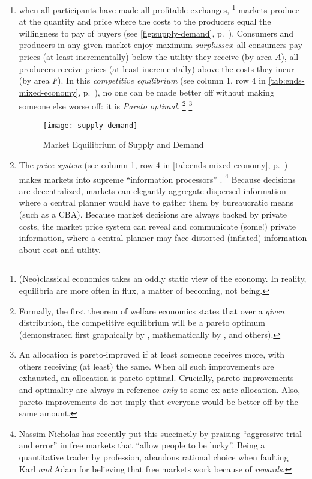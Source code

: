\begin{enumerate}
	\item when all  participants have made all profitable exchanges,
	\footnote{
		(Neo)classical economics takes an oddly static view of the economy.
		In reality, equilibria are more often in flux, a matter of becoming, not being.
	}
	markets produce at the quantity and price where the costs to the producers equal the willingness to pay of buyers (see \autoref{fig:supply-demand}, p.~\pageref{fig:supply-demand}).
	Consumers and producers in any given market enjoy maximum \emph{surplusses}:
	all consumers pay prices (at least incrementally) below the utility they receive (by area $A$), all producers receive prices (at least incrementally) above the costs they incur (by area $F$).
	In this \emph{competitive equilibrium} (see column 1, row 4 in \autoref{tab:ends-mixed-economy}, p.~\pageref{tab:ends-mixed-economy}), no one can be made better off without making someone else worse off:
	it is \emph{Pareto optimal}.
	\footnote{\label{fn:1st-theorem}
		Formally, the first theorem of welfare economics states that over a \emph{given} distribution, the competitive equilibrium will be a pareto optimum (demonstrated first graphically by \cite{Lerner1944}, mathematically by \cite{Lange1934}, \cite{Debreu1954} and others).
	}
	\footnote{
		An allocation is pareto-improved if at least someone receives more, with others receiving (at least) the same.
		When all such improvements are exhausted, an allocation is pareto optimal.
		Crucially, pareto improvements and optimality are always in reference \emph{only} to some ex-ante allocation.
		Also, pareto improvements do not imply that everyone would be better off by the same amount.
	}
	\begin{figure}[htbp]
		\centering
		\texttt{[image: supply-demand]}
		\caption{Market Equilibrium of Supply and Demand}
		\label{fig:supply-demand}
	\end{figure}

	\item The \emph{price system} (see column 1, row 4 in \autoref{tab:ends-mixed-economy}, p.~\pageref{tab:ends-mixed-economy}) makes markets into supreme ``information processors'' \citep{Hayek1931}.
	\footnote{
		Nassim Nicholas \citeauthor{Taleb2007} has recently put this succinctly by praising ``aggressive trial and error'' \citeyearpar[xxi]{Taleb2007} in free markets that ``allow people to be lucky''.
		Being a quantitative trader by profession, \citeauthor{Taleb2007} abandons rational choice when faulting Karl \citeauthor{Marx-1867-aa} \emph{and} Adam \citeauthor{Smith-1776-lq} for believing that free markets work because of \emph{rewards}.
	}
	Because decisions are decentralized, markets can elegantly aggregate dispersed information where a central planner would have to gather them by bureaucratic means (such as a \gls{CBA}).
	Because market decisions are always backed by private costs, the market price system can reveal and communicate (some!) private information, where a central planner may face distorted (inflated) information about cost and utility.
\end{enumerate}


